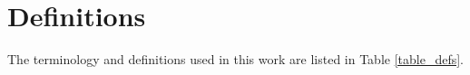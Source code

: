 \documentclass[sr]{drdc-report}
\begin{document}
\section{Definitions}\label{Definitions_section_label}
The terminology and definitions used in this work are listed in Table \ref{table_defs}.








\end{document}
